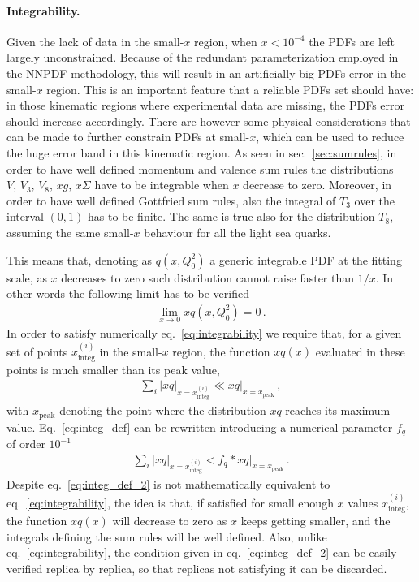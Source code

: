 \paragraph{Integrability.}
Given the lack of data in the small-$x$ region, when $x<10^{-4}$ the PDFs are left largely unconstrained. 
Because of the redundant parameterization employed in the NNPDF methodology, this will result in 
an artificially big PDFs error in the small-$x$ region.
This is an important feature that a reliable PDFs set should have: in those kinematic regions where experimental data
are missing, the PDFs error should increase accordingly.
There are however some physical considerations that can be made to further constrain PDFs at small-$x$, 
which can be used to reduce the huge error band in this kinematic region. 
As seen in sec.~\ref{sec:sumrules}, in order to have well defined momentum and valence sum rules
the distributions $V,\, V_3,\, V_8,\, xg,\, x\Sigma$ have to be integrable when $x$ decrease to zero.
Moreover, in order to have well defined Gottfried sum rules, also the integral of $T_3$ over the interval
$\left(0,1\right)$ has to be finite. 
The same is true also for the distribution $T_8$, assuming the same small-$x$ behaviour for all the light sea quarks.

This means that, denoting as $q\left(x,Q_0^2\right)$ a generic integrable PDF at the fitting scale, as $x$ decreases to zero
such distribution cannot raise faster than $1/x$. In other words the following limit has to be verified
\begin{align}
    \label{eq:integrability}
    \lim_{x\rightarrow 0} xq\left(x,Q_0^2\right) = 0\,.
\end{align}
%
In order to satisfy numerically eq.~\eqref{eq:integrability}
we require that, for a given set of points $x^{(i)}_{\text{integ}}$ in the small-$x$ region,
the function $xq\left(x\right)$ evaluated in these points is much smaller than its peak value,
\begin{align}
    \label{eq:integ_def}
    \sum_i|xq|_{x=x^{(i)}_{\text{integ}}} \ll xq|_{x=x_{\text{peak}}}\,,
\end{align}
with $x_{\text{peak}}$ denoting the point where the distribution $xq$ reaches its maximum value.
Eq.~\eqref{eq:integ_def} can be rewritten introducing a numerical parameter $f_q$ of order $10^{-1}$
\begin{align}
    \label{eq:integ_def_2}
    \sum_i|xq|_{x=x^{(i)}_{\text{integ}}} < f_q*xq|_{x=x_{\text{peak}}}\,.
\end{align}
Despite eq.~\eqref{eq:integ_def_2} is not mathematically equivalent to eq.~\eqref{eq:integrability},
 the idea is that,
if satisfied for small enough $x$ values $x^{(i)}_{\text{integ}}$, the function $xq\left(x\right)$ will 
decrease to zero as $x$ keeps getting smaller, and the integrals defining the sum rules will be 
well defined. Also, unlike eq.~\eqref{eq:integrability}, the condition given
in eq.~\eqref{eq:integ_def_2} can be easily verified replica by replica, so that replicas not satisfying it
can be discarded.

